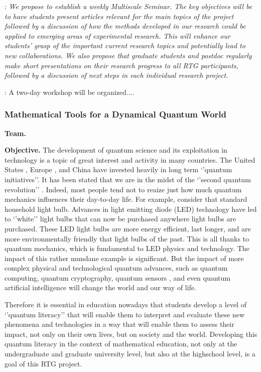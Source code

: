 \documentclass[11pt]{article}
\begin{document}
: \emph{We propose to establish a weekly Multiscale Seminar. The key objectives will be to have students present articles relevant for the main topics of the project followed by a discussion of how the methods developed in our research could be applied to emerging areas of experimental research. This will enhance our students’ grasp of the important current research topics and potentially lead to new collaborations. We also propose that graduate students and postdoc regularly make short presentations on their research progress to all RTG participants, followed by a discussion of next steps in each individual research project.}

:  A two-day workshop will be organized....

\subsubsection{Mathematical Tools for a Dynamical Quantum World}
\noindent
{\bf Team.}
\medskip

\noindent
{\bf Objective.} The development of quantum science and its exploitation in technology is a topic of great interest and activity in many countries. The United States \cite{raymer2019us}, Europe \cite{riedel2019europe}, and China \cite{kania2018quantum} have invested heavily in long term ‘’quantum initiatives’’.  It has been stated that we are in the midst of the ‘’second quantum revolution’’ \cite{kania2018quantum}. Indeed,  most people tend not to reaize just how much quantum mechanics influences their day-to-day life. For example, consider that standard household light bulb. Advances in light emitting diode (LED) technology have led to ‘’white’’ light bulbs that can now be purchased anywhere light bulbs are purchased. These LED light bulbs are more energy efficient, last longer, and are more environmentally friendly that light bulbs of the past. This is all thanks to quantum mechanics, which is fundamental to LED physics and technology. The impact of this rather mundane example is significant. But the impact of more complex physical and technological quantum advances, such as quantum computing, quantum cryptography, quantum sensors \cite{ng2020guest}, and even quantum artificial intelligence \cite{taylor2020quantum} will change the world and our way of life.

Therefore it is essential in education nowadays that students develop a level of ‘’quantum literacy’’ that will enable them to interpret and evaluate these new phenomena and technologies in a way that will enable them to assess their impact, not only on their own  lives, but on society and the world. Developing this quantum literacy  in the context of mathematical education, not only at the undergraduate and graduate  university level, but also at the highschool level, is a goal of this RTG project.
\end{document}
